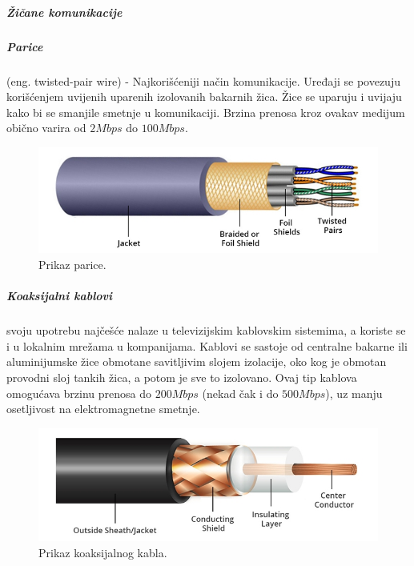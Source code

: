 \documentclass[a4paper]{article}
\begin{document}
\subparagraph{Žičane komunikacije} 
\subparagraph{Parice}(eng. twisted-pair wire) - Najkorišćeniji način komunikacije. Uređaji se povezuju korišćenjem uvijenih uparenih izolovanih bakarnih žica. Žice se uparuju i uvijaju kako bi se smanjile smetnje u komunikaciji. Brzina prenosa kroz ovakav medijum obično varira od $2Mbps$ do $100Mbps$.
\begin{figure}[h!]
\begin{center}
\includegraphics[scale=0.5]{pictures/twpw.jpg}
\end{center}
\caption{Prikaz parice.}
\label{fig:twpw}
\end{figure}

\subparagraph{Koaksijalni kablovi} svoju upotrebu najčešće nalaze u televizijskim kablovskim sistemima, a koriste se i u lokalnim mrežama u kompanijama. Kablovi se sastoje od centralne bakarne ili aluminijumske žice obmotane savitljivim slojem izolacije, oko kog je obmotan provodni sloj tankih žica, a potom je sve to izolovano. Ovaj tip kablova omogućava brzinu prenosa do $200Mbps$ (nekad čak i do $500Mbps$), uz manju osetljivost na elektromagnetne smetnje. 

\begin{figure}[h!]
\begin{center}
\includegraphics[scale=0.5]{pictures/coax.jpg}
\end{center}
\caption{Prikaz koaksijalnog kabla.}
\label{fig:coax}
\end{figure}
\end{document}
